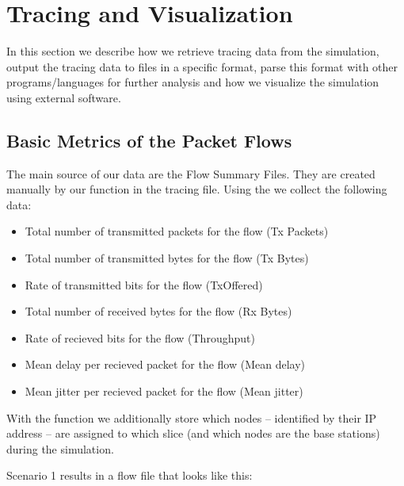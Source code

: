 

\chapter{Tracing and Visualization}
\label{chapter:tracing}
In this section we describe how we retrieve tracing data from the simulation, output the tracing data to files in a specific format, parse this format with other programs/languages for further analysis and how we visualize the simulation using external software.

\section{Basic Metrics of the Packet Flows}
The main source of our data are the Flow Summary Files. They are created manually by our function  in the tracing file.
Using the  we collect the following data:
\begin{itemize}
	\item Total number of transmitted packets for the flow (Tx Packets)
	\item Total number of transmitted bytes for the flow (Tx Bytes)
	\item Rate of transmitted bits for the flow (TxOffered)
	\item Total number of received bytes for the flow (Rx Bytes)
	\item Rate of recieved bits for the flow (Throughput)
	\item Mean delay per recieved packet for the flow (Mean delay)
	\item Mean jitter per recieved packet for the flow (Mean jitter)
\end{itemize}

With the function  we additionally store which nodes -- identified by their IP address -- are assigned to which slice (and which nodes are the base stations) during the simulation.

Scenario 1 results in a flow file that looks like this:

